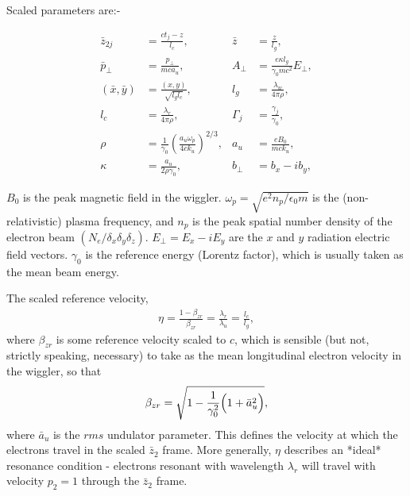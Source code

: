 \documentclass[12pt]{article}%
\begin{document}
Scaled parameters are:-






\begin{align}
\bar{z}_{2j} &= \frac{ct_j - z}{l_c}, &\bar{z} &= \frac{z}{l_g}, \nonumber \\
\bar{p}_{\bot} &= \frac{p_{\bot}}{mc a_u},
&A_{\bot}&=\frac{e \kappa l_g}{\gamma_0 mc^2 }E_{\bot}, \nonumber \\
(\bar{x},\bar{y}) &= \frac{(x,y)}{\sqrt{l_g l_c}}, &l_g &= \frac{\lambda_w}{4\pi\rho}, \nonumber \\
l_c &= \frac{\lambda_r}{4\pi\rho}, & \Gamma_j& = \frac{\gamma_j}{\gamma_0}, \nonumber \\
\rho &=\frac{1}{\gamma_0}\left(\frac{a_u \omega_p}{4ck_u}\right)^{2/3},
&a_u & =\frac{eB_0}{mck_u}, \nonumber \\
\kappa & = \frac{a_u}{2 \rho \gamma_0}, & b_{\bot} & = b_x - i b_y, \nonumber
\end{align}

$B_0$ is the peak magnetic field in the wiggler.
$\omega_p = \sqrt{e^2 n_p / \epsilon_0 m}$ is the (non-relativistic) plasma frequency, and $n_p$ is the peak spatial number density of the electron beam $(N_e / \delta_x \delta_y \delta_z)$.
$E_\bot = E_x - i E_y$ are the $x$ and $y$ radiation electric field vectors. $\gamma_0$ is the reference energy (Lorentz factor), which is usually taken as the mean beam energy.

The scaled reference velocity,
\begin{align}
\eta = \frac{1 - \beta_{zr}}{\beta_{zr}} = \frac{\lambda_r}{\lambda_u} = \frac{l_c}{l_g},
\end{align}
where $\beta_{zr}$ is some reference velocity scaled to $c$, which is sensible (but not, strictly speaking, necessary) to take as the mean longitudinal electron velocity in the wiggler, so that
\begin{align}
\beta_{zr} = \sqrt{ 1 - \frac{1}{\gamma_0^2}\Bigl(1 + \bar{a}_u^2\Bigr)},
\end{align}
where $\bar{a}_u$ is the $rms$ undulator parameter.
This defines the velocity at which the electrons travel in the scaled $\bar{z}_2$ frame. More generally, $\eta$ describes an *ideal* resonance condition - electrons resonant with wavelength $\lambda_r$ will travel with velocity $p_2=1$ through the $\bar{z}_2$ frame.
\end{document}
